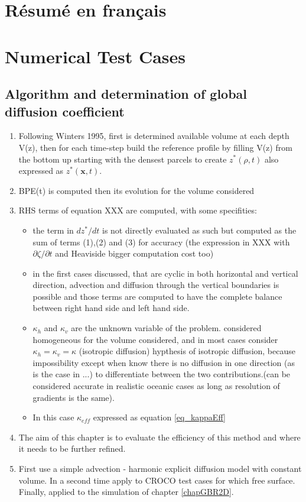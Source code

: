 
\section{Résumé en français}

\section{Numerical Test Cases}

\subsection{Algorithm and determination of global diffusion coefficient}
\begin{enumerate}
\setlength\itemsep{0pt}
\item Following Winters 1995, first is determined available volume at each depth V(z), then for each time-step build the reference profile by filling V(z) from the bottom up starting with the densest parcels to create $z^*(\rho,t)$ also expressed as $z^*(\mathbf{x},t)$.
\item BPE(t) is computed then its evolution for the volume considered
\item RHS terms of equation XXX are computed, with some specifities:
\begin{itemize}
\setlength\itemsep{0pt}
\item the term in $dz^*/dt$ is not directly evaluated as such but computed as the sum of terms (1),(2) and (3) for accuracy (the expression in XXX with $\partial \zeta / \partial t$ and Heaviside bigger computation cost too)
\item in the first cases discussed, that are cyclic in both horizontal and vertical direction, advection and diffusion through the vertical boundaries is possible and those terms are computed to have the complete balance between right hand side and left hand side.
\item $\kappa_h$ and $\kappa_v$ are the unknown variable of the problem. considered homogeneous for the volume considered, and in most cases consider $\kappa_h=\kappa_v=\kappa$ (isotropic diffusion) hypthesis of isotropic diffusion, because impossibility except when know there is no diffusion in one direction (as is the case in ...) to differentiate between the two contributions.(can be considered accurate in realistic oceanic cases as long as resolution of gradients is the same).
\item In this case $\kappa_{eff}$ expressed as equation \ref{eq_kappaEff}
\end{itemize}
\item The aim of this chapter is to evaluate the efficiency of this method and where it needs to be further refined.
\item First use a simple advection - harmonic explicit diffusion model with constant volume. In a second time apply to CROCO test cases for which free surface. Finally, applied to the simulation of chapter \ref{chapGBR2D}.
\end{enumerate}

